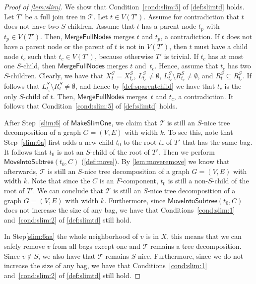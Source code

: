 \documentclass[a4paper,UKenglish,cleveref, autoref, thm-restate, numberwithinsect]{lipics-v2021}
\newcommand{\MoveIntoSubtree}{\mathsf{MoveIntoSubtree}}
\newcommand{\MergeFullNodes}{\mathsf{MergeFullNodes}}
\newcommand{\MakeSlim}{\mathsf{MakeSlimOne}}
\begin{document}
\begin{proof}[Proof of \cref{lem:slim}]
We show that Condition~\ref{cond:slim:5} of \cref{def:slimtd} holds. Let $T'$ be a full join tree in $\mathcal{T}$. Let $t\in V(T')$. Assume for contradiction that $t$ does not have two $S$-children. Assume that $t$ has a parent node $t_p$ with $t_p\in V(T')$. Then, $\MergeFullNodes$ merges $t$ and $t_p$, a contradiction.
If $t$ does not have a parent node or the parent of $t$ is not in $V(T')$, then $t$ must have a child node $t_c$ such that $t_c\in V(T')$, because otherwise $T'$ is trivial. If $t_c$ has at most one $S$-child, then $\MergeFullNodes$ merges $t$ and~$t_c$. Hence, assume that $t_c$ has two $S$-children. 
Clearly, we have that $X_t^S=X_{t_c}^S$, $L^S_{t_c}\neq\emptyset$, $L^S_{t_c}\setminus R^S_{t_c}\neq\emptyset$, and $R^S_{t}\subseteq R^S_{t_c}$. If follows that $L^S_{t_c}\setminus R^S_{t}\neq\emptyset$, and hence by \cref{def:sparentchild} we have that $t_c$ is the only $S$-child of $t$. Then, $\MergeFullNodes$ merges~$t$ and $t_c$, a contradiction. It follows that Condition~\ref{cond:slim:5} of \cref{def:slimtd} holds.

After Step~\ref{slim:6} of $\MakeSlim$, we claim that $\mathcal{T}$ is still an $S$-nice tree decomposition of a graph $G=(V,E)$ with width $k$.
To see this, note that Step~\ref{slim:6a} first adds a new child $t_0$ to the root $t_r$ of $T'$ that has the same bag. It follows that $t_0$ is not an $S$-child of the root of $T'$. Then we perform $\MoveIntoSubtree(t_0,C)$ (\cref{def:move}). By \cref{lem:moveremove} we know that afterwards, $\mathcal{T}$ is still an $S$-nice tree decomposition of a graph $G=(V,E)$ with width $k$. Note that since the $C$ is an $F$-component, $t_0$ is still a non-$S$-child of the root of $T'$. 
We can conclude that $\mathcal{T}$ is still an $S$-nice tree decomposition of a graph $G=(V,E)$ with width $k$. Furthermore, since $\MoveIntoSubtree(t_0,C)$ does not increase the size of any bag, we have that Conditions~\ref{cond:slim:1} and~\ref{cond:slim:2} of \cref{def:slimtd} still hold.

In Step\ref{slim:6aa} the whole neighborhood of $v$ is in $X$, this means that we can safely remove $v$ from all bags except one and $\mathcal{T}$ remains a tree decomposition. Since $v\notin S$, we also have that $\mathcal{T}$ remains $S$-nice. Furthermore, since we do not increase the size of any bag, we have that Conditions~\ref{cond:slim:1} and~\ref{cond:slim:2} of \cref{def:slimtd} still hold.




\end{proof}
\end{document}
